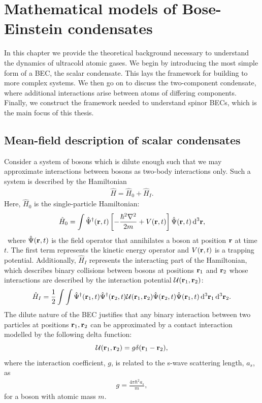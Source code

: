 \chapter{Mathematical models of Bose-Einstein condensates}\label{chap: theory}

In this chapter we provide the theoretical background necessary to understand
the dynamics of ultracold atomic gases.
We begin by introducing the most simple form of a BEC, the scalar condensate.
This lays the framework for building to more complex systems.
We then go on to discuss the two-component condensate, where additional
interactions arise between atoms of differing components.
Finally, we construct the framework needed to understand spinor BECs, which is
the main focus of this thesis.

\section{Mean-field description of scalar condensates}
Consider a system of bosons which is dilute enough such that we may approximate
interactions between bosons as two-body interactions only.
Such a system is described by the Hamiltonian~\cite{Pitaevskii2003}
\begin{align}\label{eq: scalar-hamiltonian}
    \hat{H} = \hat{H}_0 + \hat{H}_I.
\end{align}
Here, \(\hat{H}_0\) is the single-particle Hamiltonian:
\begin{align}
    \hat{H}_0 = \int \hat{\Psi}^\dagger(\vb{r}, t)\left[
        -\frac{\hbar^2\nabla^2}{2m} + V(\vb{r}, t)
    \right]\hat{\Psi}(\vb{r}, t)\, \dd^3\vb{r},
\end{align}\
where \(\hat{\Psi}(\vb{r}, t)\) is the field operator that annihilates a boson
at position \(\vb{r}\) at time \(t\).
The first term represents the kinetic energy operator and \(V(\vb{r}, t)\)
is a trapping potential.
Additionally, \(\hat{H}_I\) represents the interacting part of the Hamiltonian,
which describes binary collisions between bosons at positions \(\vb{r}_1\) and
\(\vb{r}_2\) whose interactions are described by the interaction potential
\(\mathcal{U}(\vb{r}_1, \vb{r}_2)\):
\begin{align}
    \hat{H}_I = \frac{1}{2}\int \int \hat{\Psi}^\dagger(\vb{r}_1, t)
    \hat{\Psi}^\dagger(\vb{r}_2, t)\mathcal{U}(\vb{r}_1, \vb{r}_2)
    \hat{\Psi}(\vb{r}_2, t)\hat{\Psi}(\vb{r}_1, t)
    \, \dd^3\vb{r}_1 \, \dd^3\vb{r}_2.
\end{align}
The dilute nature of the BEC justifies that any binary interaction
between two particles at positions \(\vb{r}_1, \vb{r}_2\) can be approximated by
a contact interaction modelled by the following delta function:
\begin{equation}
    \mathcal{U}(\vb{r}_1, \vb{r}_2) = g\delta(\vb{r}_1 - \vb{r}_2),
\end{equation}
where the interaction coefficient, \(g\), is related to the s-wave scattering
length, \(a_s\), as
\begin{align}\label{eq: scalar-interaction-coeff}
    g = \frac{4\pi\hbar^2a_s}{m},
\end{align}
for a boson with atomic mass \(m\).

